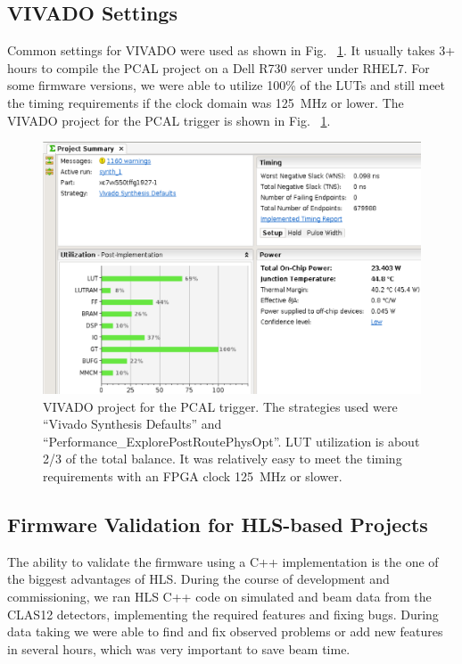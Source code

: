 \subsection{VIVADO Settings}

Common settings for VIVADO were used as shown in Fig. ~\ref{fig:vivado}. It usually takes 3+ hours to compile
the PCAL project on a Dell R730 server under RHEL7. For some firmware versions, we were able to utilize
100\% of the LUTs and still meet the timing requirements if the clock domain was 125~MHz or lower. The
VIVADO project for the PCAL trigger is shown in Fig. ~\ref{fig:vivado}.

\begin{figure}[hbt]
	\centering
	\includegraphics[width=1.0\columnwidth,keepaspectratio]{img/vivado.png}
	\caption{VIVADO project for the PCAL trigger. The strategies used were ``Vivado Synthesis Defaults''
          and ``Performance\_ExplorePostRoutePhysOpt''. LUT utilization is about 2/3 of the total balance. It
          was relatively easy to meet the timing requirements with an FPGA clock 125~MHz or slower.}
	\label{fig:vivado}
\end{figure}

\subsection{Firmware Validation for HLS-based Projects}

The ability to validate the firmware using a C++ implementation is the one of the biggest advantages of HLS.
During the course of development and commissioning, we ran HLS C++ code on simulated and beam data from
the CLAS12 detectors, implementing the required features and fixing bugs. During data taking we were able
to find and fix observed problems or add new features in several hours, which was very important to save
beam time.

